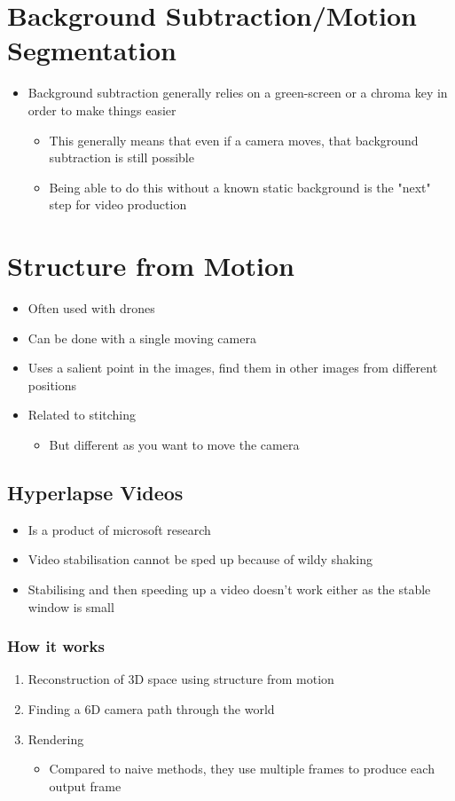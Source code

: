 \documentclass[a4paper]{article}
\begin{document}
\section{Background Subtraction/Motion Segmentation}
\label{sec-8}
\begin{itemize}
\item Background subtraction generally relies on a green-screen or a chroma key in order to make things easier
\begin{itemize}
\item This generally means that even if a camera moves, that background subtraction is still possible
\item Being able to do this without a known static background is the "next" step for video production
\end{itemize}
\end{itemize}

\section{Structure from Motion}
\label{sec-9}
\begin{itemize}
\item Often used with drones
\item Can be done with a single moving camera
\item Uses a salient point in the images, find them in other images from different positions
\item Related to stitching
\begin{itemize}
\item But different as you want to move the camera
\end{itemize}
\end{itemize}


\subsection{Hyperlapse Videos}
\label{sec-9-1}
\begin{itemize}
\item Is a product of microsoft research
\item Video stabilisation cannot be sped up because of wildy shaking
\item Stabilising and then speeding up a video doesn't work either as the stable window is small
\end{itemize}
\subsubsection{How it works}
\label{sec-9-1-1}
\begin{enumerate}
\item Reconstruction of 3D space using structure from motion
\item Finding a 6D camera path through the world
\item Rendering
\begin{itemize}
\item Compared to naive methods, they use multiple frames to produce each output frame
\end{itemize}
\end{enumerate}
\end{document}
